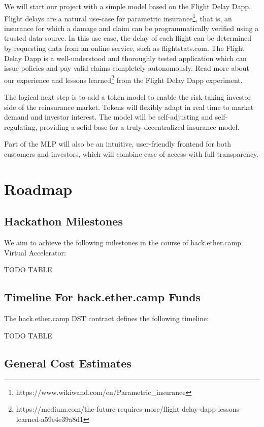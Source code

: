 \documentclass[12pt]{article}
\begin{document}
We will start our project with a simple model based on the Flight Delay Dapp. Flight delays are a natural use-case for parametric insurance\footnote{https://www.wikiwand.com/en/Parametric\_insurance}, that is, an insurance for which a damage and claim can be programmatically verified using a trusted data source. In this use case, the delay of each flight can be determined by requesting data from an online service, such as flightstats.com. The Flight Delay Dapp is a well-understood and thoroughly tested application which can issue policies and pay valid claims completely autonomously. Read more about our experience and lessons learned\footnote{https://medium.com/the-future-requires-more/flight-delay-dapp-lessons-learned-a59e4e39a8d1} from the Flight Delay Dapp experiment.

The logical next step is to add a token model to enable the risk-taking investor side of the reinsurance market. Tokens will flexibly adapt in real time to market demand and investor interest. The model will be self-adjusting and self-regulating, providing a solid base for a truly decentralized insurance model.

Part of the MLP will also be an intuitive, user-friendly frontend for both customers and investors, which will combine ease of access with full transparency.


\section{Roadmap}

\subsection{Hackathon Milestones}

We aim to achieve the following milestones in the course of hack.ether.camp Virtual Accelerator:


TODO TABLE

\subsection{Timeline For hack.ether.camp Funds}

The hack.ether.camp DST contract defines the following timeline:


TODO TABLE

\subsection{General Cost Estimates}
\end{document}
